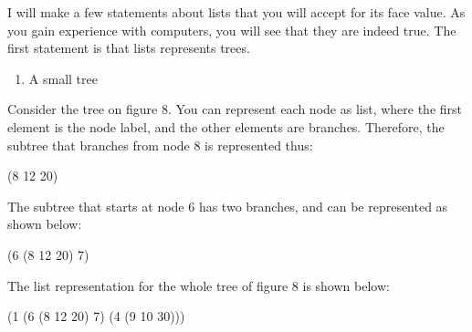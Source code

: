 \documentclass[
  12pt,
]{book}
\newenvironment{Shaded}{}{}
\newcommand{\DecValTok}[1]{\textcolor[rgb]{0.25,0.63,0.44}{#1}}
\newcommand{\NormalTok}[1]{#1}
\providecommand{\tightlist}{%
  \setlength{\itemsep}{0pt}\setlength{\parskip}{0pt}}
\begin{document}
I will make a few statements about lists that you will accept for its
face value. As you gain experience with computers, you will see that
they are indeed true. The first statement is that lists represents
trees.


\begin{enumerate}
\def\labelenumi{(\arabic{enumi})}
\setcounter{enumi}{7}
\tightlist
\item
  A small tree
\end{enumerate}

Consider the tree on figure 8. You can represent each node as list,
where the first element is the node label, and the other elements are
branches. Therefore, the subtree that branches from node 8 is
represented thus:

\begin{Shaded}
\begin{Highlighting}[]
\NormalTok{(}\DecValTok{8} \DecValTok{12} \DecValTok{20}\NormalTok{)}
\end{Highlighting}
\end{Shaded}

The subtree that starts at node 6 has two branches, and can be
represented as shown below:

\begin{Shaded}
\begin{Highlighting}[]
\NormalTok{(}\DecValTok{6}\NormalTok{ (}\DecValTok{8} \DecValTok{12} \DecValTok{20}\NormalTok{) }\DecValTok{7}\NormalTok{)}
\end{Highlighting}
\end{Shaded}

The list representation for the whole tree of figure 8 is shown below:

\begin{Shaded}
\begin{Highlighting}[]
\NormalTok{(}\DecValTok{1}\NormalTok{ (}\DecValTok{6}\NormalTok{ (}\DecValTok{8} \DecValTok{12} \DecValTok{20}\NormalTok{)}
      \DecValTok{7}\NormalTok{)}
\NormalTok{   (}\DecValTok{4}\NormalTok{ (}\DecValTok{9} \DecValTok{10} \DecValTok{30}\NormalTok{)))}
\end{Highlighting}
\end{Shaded}
\end{document}
